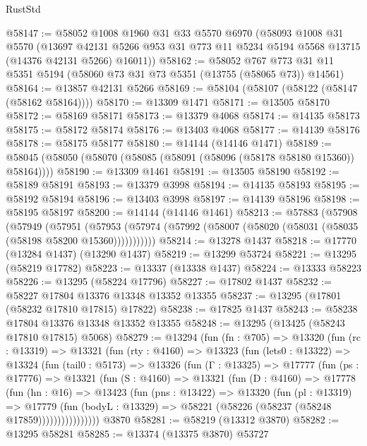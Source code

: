 \begin{lexlean}{RustStd}
\begin{coremodule}
@58147 := @58052
    @1008
    @1960
    @31
    @33
    @5570
    @6970
    (@58093
      @1008
      @31
      @5570
      (@13697 @42131 @5266 @953 @31 @773 @11 @5234 @5194 @5568 @13715 (@14376 @42131 @5266) @16011))
@58162 := @58052
    @767
    @773
    @31
    @11
    @5351
    @5194
    (@58060 @73 @31 @73 @5351 (@13755 (@58065 @73)) @14561)
@58164 := @13857 @42131 @5266
@58169 := @58104 (@58107 (@58122 (@58147 (@58162 @58164))))
@58170 := @13309 @1471
@58171 := @13505 @58170
@58172 := @58169 @58171
@58173 := @13379 @4068
@58174 := @14135 @58173
@58175 := @58172 @58174
@58176 := @13403 @4068
@58177 := @14139 @58176
@58178 := @58175 @58177
@58180 := @14144 (@14146 @1471)
@58189 := @58045 (@58050 (@58070 (@58085 (@58091 (@58096 (@58178 @58180 @15360)) @58164))))
@58190 := @13309 @1461
@58191 := @13505 @58190
@58192 := @58189 @58191
@58193 := @13379 @3998
@58194 := @14135 @58193
@58195 := @58192 @58194
@58196 := @13403 @3998
@58197 := @14139 @58196
@58198 := @58195 @58197
@58200 := @14144 (@14146 @1461)
@58213 := @57883
    (@57908
      (@57949
        (@57951
          (@57953 (@57974 (@57992 (@58007 (@58020 (@58031 (@58035 (@58198 @58200 @15360)))))))))))
@58214 := @13278 @1437
@58218 := @17770 (@13284 @1437) (@13290 @1437)
@58219 := @13299 @53724
@58221 := @13295 (@58219 @17782)
@58223 := @13337 (@13338 @1437)
@58224 := @13333 @58223
@58226 := @13295 (@58224 @17796)
@58227 := @17802 @1437
@58232 := @58227 @17804 @13376 @13348 @13352 @13355
@58237 := @13295 (@17801 (@58232 @17810 @17815) @17822)
@58238 := @17825 @1437
@58243 := @58238 @17804 @13376 @13348 @13352 @13355
@58248 := @13295 (@13425 (@58243 @17810 @17815) @5068)
@58279 := @13294
    (fun (fn : @705) =>
    @13320
      (fun (rc : @13319) =>
      @13321
        (fun (rty : @4160) =>
        @13323
          (fun (lets0 : @13322) =>
          @13324
            (fun (tail0 : @5173) =>
            @13326
              (fun (Γ : @13325) =>
              @17777
                (fun (ps : @17776) =>
                @13321
                  (fun (S : @4160) =>
                  @13321
                    (fun (D : @4160) =>
                    @17778
                      (fun (hn : @16) =>
                      @13423
                        (fun (pns : @13422) =>
                        @13320
                          (fun (pl : @13319) =>
                          @17779
                            (fun (bodyL : @13329) =>
                            @58221 (@58226 (@58237 (@58248 @17859))))))))))))))))
    @3870
@58281 := @58219 (@13312 @3870)
@58282 := @13295 @58281
@58285 := @13374 (@13375 @3870) @53727

\end{coremodule}
\end{lexlean}
